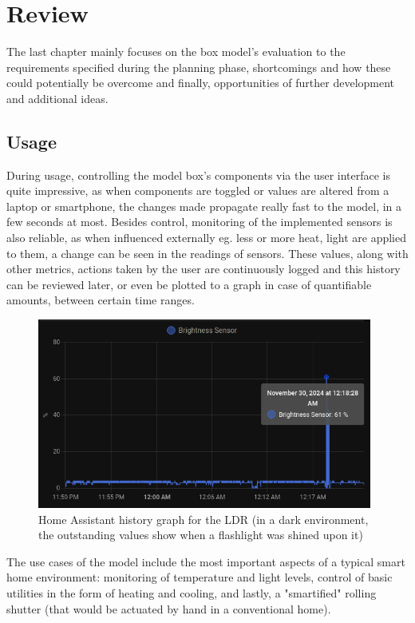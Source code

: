 \chapter{Review}

The last chapter mainly focuses on the box model's evaluation to the requirements specified during the planning phase, shortcomings and how these could potentially be overcome and finally, opportunities of further development and additional ideas.

\section{Usage}

During usage, controlling the model box's components via the user interface is quite impressive, as when components are toggled or values are altered from a laptop or smartphone, the changes made propagate really fast to the model, in a few seconds at most. Besides control, monitoring of the implemented sensors is also reliable, as when influenced externally eg. less or more heat, light are applied to them, a change can be seen in the readings of sensors. These values, along with other metrics, actions taken by the user are continuously logged and this history can be reviewed later, or even be plotted to a graph in case of quantifiable amounts, between certain time ranges.

\begin{figure}[!ht]
    \centering
    \includegraphics[width=110mm, keepaspectratio]{figures/homeassistant_graph_history.png}
    \caption{Home Assistant history graph for the LDR (in a dark environment, the outstanding values show when a flashlight was shined upon it)}
    \label{fig:HAgraphHistory}
  \end{figure}

The use cases of the model include the most important aspects of a typical smart home environment: monitoring of temperature and light levels, control of basic utilities in the form of heating and cooling, and lastly, a "smartified" rolling shutter (that would be actuated by hand in a conventional home).

